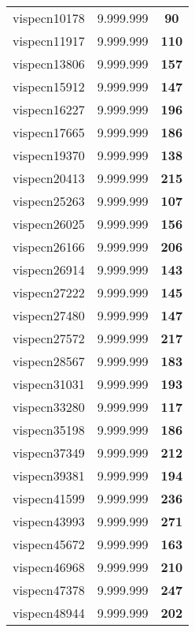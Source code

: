 \begin{tabular}{cc||c}
vispecn10178     & 9.999.999        & {\bf 90}        \\ 
vispecn11917     & 9.999.999        & {\bf 110}       \\ 
vispecn13806     & 9.999.999        & {\bf 157}       \\ 
vispecn15912     & 9.999.999        & {\bf 147}       \\ 
vispecn16227     & 9.999.999        & {\bf 196}       \\ 
vispecn17665     & 9.999.999        & {\bf 186}       \\ 
vispecn19370     & 9.999.999        & {\bf 138}       \\ 
vispecn20413     & 9.999.999        & {\bf 215}       \\ 
vispecn25263     & 9.999.999        & {\bf 107}       \\ 
vispecn26025     & 9.999.999        & {\bf 156}       \\ 
vispecn26166     & 9.999.999        & {\bf 206}       \\ 
vispecn26914     & 9.999.999        & {\bf 143}       \\ 
vispecn27222     & 9.999.999        & {\bf 145}       \\ 
vispecn27480     & 9.999.999        & {\bf 147}       \\ 
vispecn27572     & 9.999.999        & {\bf 217}       \\ 
vispecn28567     & 9.999.999        & {\bf 183}       \\ 
vispecn31031     & 9.999.999        & {\bf 193}       \\ 
vispecn33280     & 9.999.999        & {\bf 117}       \\ 
vispecn35198     & 9.999.999        & {\bf 186}       \\ 
vispecn37349     & 9.999.999        & {\bf 212}       \\ 
vispecn39381     & 9.999.999        & {\bf 194}       \\ 
vispecn41599     & 9.999.999        & {\bf 236}       \\ 
vispecn43993     & 9.999.999        & {\bf 271}       \\ 
vispecn45672     & 9.999.999        & {\bf 163}       \\ 
vispecn46968     & 9.999.999        & {\bf 210}       \\ 
vispecn47378     & 9.999.999        & {\bf 247}       \\ 
vispecn48944     & 9.999.999        & {\bf 202}       \\ 

\end{tabular}
